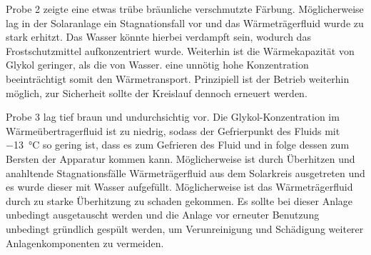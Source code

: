 Probe 2 zeigte eine etwas trübe bräunliche verschmutzte Färbung. Möglicherweise lag in der Solaranlage ein Stagnationsfall vor und das Wärmeträgerfluid wurde zu stark erhitzt. Das Wasser könnte hierbei verdampft sein, wodurch das Frostschutzmittel aufkonzentriert wurde. Weiterhin ist die Wärmekapazität von Glykol geringer, als die von Wasser. eine unnötig hohe Konzentration beeinträchtigt somit den Wärmetransport. Prinzipiell ist der Betrieb weiterhin möglich, zur Sicherheit sollte der Kreislauf dennoch erneuert werden.

Probe 3 lag tief braun und undurchsichtig vor.  Die Glykol-Konzentration im Wärmeübertragerfluid ist zu niedrig, sodass der Gefrierpunkt des Fluids mit \SI{-13}{\celsius} so gering ist, dass es zum Gefrieren des Fluid und in folge dessen zum Bersten der Apparatur kommen kann. Möglicherweise ist durch Überhitzen und anahltende Stagnationsfälle Wärmeträgerfluid aus dem Solarkreis ausgetreten und es wurde dieser mit Wasser aufgefüllt. Möglicherweise ist das Wärmeträgerfluid durch zu starke Überhitzung zu schaden gekommen. Es sollte bei dieser Anlage unbedingt ausgetauscht werden und die Anlage vor erneuter Benutzung unbedingt gründlich gespült werden, um Verunreinigung und Schädigung weiterer Anlagenkomponenten zu vermeiden. 